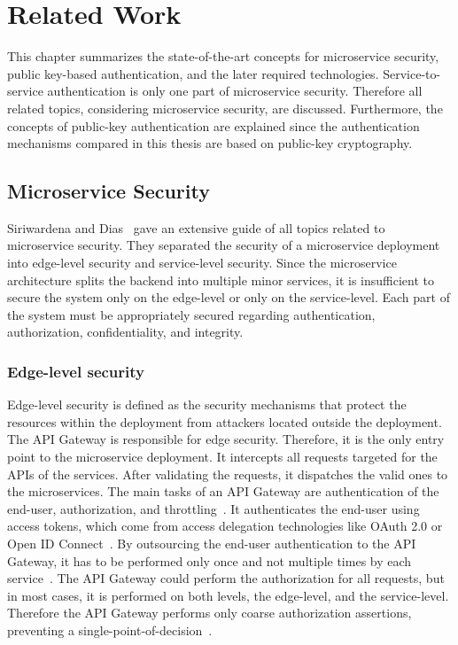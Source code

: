 \chapter{Related Work}
\label{cha:Related_Work}
This chapter summarizes the state-of-the-art concepts for microservice security, public key-based authentication, and the later required technologies.
Service-to-service authentication is only one part of microservice security.
Therefore all related topics, considering microservice security, are discussed.
Furthermore, the concepts of public-key authentication are explained since the authentication mechanisms compared in this thesis are based on public-key cryptography.

\section{Microservice Security}
Siriwardena and Dias~\cite{dias2020microservices} gave an extensive guide of all topics related to microservice security. 
They separated the security of a microservice deployment into edge-level security and service-level security.
Since the microservice architecture splits the backend into multiple minor services, it is insufficient to secure the system only on the edge-level or only on the service-level.
Each part of the system must be appropriately secured regarding authentication, authorization, confidentiality, and integrity.

\subsection{Edge-level security}
Edge-level security is defined as the security mechanisms that protect the resources within the deployment from attackers located outside the deployment. 
The API Gateway is responsible for edge security. 
Therefore, it is the only entry point to the microservice deployment.
It intercepts all requests targeted for the APIs of the services.
After validating the requests, it dispatches the valid ones to the microservices.
The main tasks of an API Gateway are authentication of the end-user, authorization, and throttling~\cite{dias2020microservices}.
It authenticates the end-user using access tokens, which come from access delegation technologies like OAuth 2.0 or Open ID Connect~\cite{siriwardena2014advanced}.
By outsourcing the end-user authentication to the API Gateway, it has to be performed only once and not multiple times by each service~\cite{dias2020microservices}.
The API Gateway could perform the authorization for all requests, but in most cases, it is performed on both levels, the edge-level, and the service-level. 
Therefore the API Gateway performs only coarse authorization assertions, preventing a single-point-of-decision~\cite{barabanov2020authentication}.

